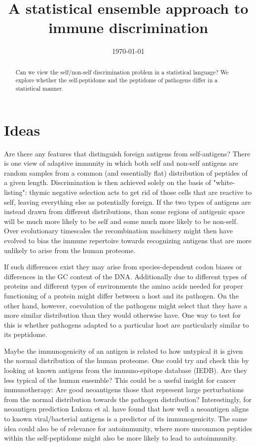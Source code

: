 \documentclass[superscriptaddress,onecolumn,pre]{revtex4}
\newcommand{\<}{\langle}
\renewcommand{\>}{\rangle}
\begin{document}
\title{A statistical ensemble approach to immune discrimination}
\date{\today}

\begin{abstract}
    Can we view the self/non-self discrimination problem in a statistical language?
    We explore whether the self-peptidome and the peptidome of pathogens differ in a statistical manner.
\end{abstract}

\maketitle

\section{Ideas}

Are there any features that distinguish foreign antigens from self-antigens? There is one view of adaptive immunity in which both self and non-self antigens are random samples from a common (and essentially flat) distribution of peptides of a given length. Discrimination is then achieved solely on the basis of "white-listing": thymic negative selection acts to get rid of those cells that are reactive to self, leaving everything else as potentially foreign. If the two types of antigens are instead drawn from different distributions, than some regions of antigenic space will be much more likely to be self and some much more likely to be non-self. Over evolutionary timescales the recombination machinery might then have evolved to bias the immune repertoire towards recognizing antigens that are more unlikely to arise from the human proteome.

If such differences exist they may arise from species-dependent codon biases or differences in the GC content of the DNA. Additionally due to different types of proteins and different types of environments the amino acids needed for proper functioning of a protein might differ between a host and its pathogen. On the other hand, however, coevolution of the pathogens might select that they have a more similar distribution than they would otherwise have. One way to test for this is whether pathogens adapted to a particular host are particularly similar to its peptidome.

Maybe the immunogenicity of an antigen is related to how untypical it is given the normal distribution of the human proteome. One could try and check this by looking at known antigens from the immuno-epitope database (IEDB). Are they less typical of the human ensemble? This could be a useful insight for cancer immunotherapy: Are good neoantigens those that represent large perturbations from the normal distribution towards the pathogen distribution? Interestingly, for neoantigen prediction Luksza et al. \cite{Luksza2017} have found that how well a neoantigen aligns to known viral/bacterial antigens is a predictor of its immunogenicity. The same idea could also be of relevance for autoimmunity, where more uncommon peptides within the self-peptidome might also be more likely to lead to autoimmunity.
\end{document}
